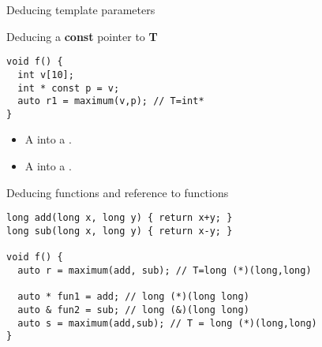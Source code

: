 \begin{frame}{Deducing template parameters}
\begin{block}{Deducing a \textbf{const} pointer to \textbf{T}}
\begin{lstlisting}
void f() {
  int v[10];
  int * const p = v;
  auto r1 = maximum(v,p); // T=int*
}
\end{lstlisting}
\end{block}

\framebreak

\begin{itemize}
  \item A   into a .

  \item A   into a . 
\end{itemize}

\begin{block}{Deducing functions and reference to functions}
\begin{lstlisting}
long add(long x, long y) { return x+y; }
long sub(long x, long y) { return x-y; }

void f() {
  auto r = maximum(add, sub); // T=long (*)(long,long)

  auto * fun1 = add; // long (*)(long long)
  auto & fun2 = sub; // long (&)(long long)
  auto s = maximum(add,sub); // T = long (*)(long,long)
}
\end{lstlisting}
\end{block}

\end{frame}
